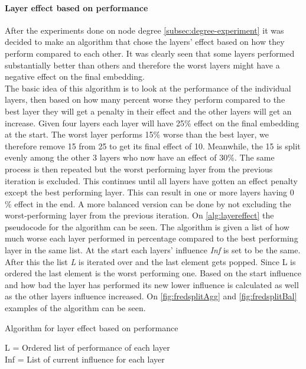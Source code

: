 \paragraph{Layer effect based on performance} \label{fredsplit}
After the experiments done on node degree \autoref{subsec:degree-experiment} it was decided to make an algorithm that chose the layers' effect based on how they perform compared to each other.
It was clearly seen that some layers performed substantially better than others and therefore the worst layers might have a negative effect on the final embedding.
\\
The basic idea of this algorithm is to look at the performance of the individual layers, then based on how many percent worse they perform compared to the best layer they will get a penalty in their effect and the other layers will get an increase.
Given four layers each layer will have 25\% effect on the final embedding at the start.
The worst layer performs 15\% worse than the best layer, we therefore remove 15 from 25 to get its final effect of 10.
Meanwhile, the 15 is split evenly among the other 3 layers who now have an effect of 30\%.
The same process is then repeated but the worst performing layer from the previous iteration is excluded.
This continues until all layers have gotten an effect penalty except the best performing layer.
This can result in one or more layers having 0 \% effect in the end.
A more balanced version can be done by not excluding the worst-performing layer from the previous iteration.
On \autoref{alg:layereffect} the pseudocode for the algorithm can be seen.
The algorithm is given a list of how much worse each layer performed in percentage compared to the best performing layer in the same list.
At the start each layers' influence \textit{Inf} is set to be the same.
After this the list \textit{L} is iterated over and the last element gets popped.
Since L is ordered the last element is the worst performing one.
Based on the start influence and how bad the layer has performed its new lower influence is calculated as well as the other layers influence increased.
On \autoref{fig:fredsplitAgg} and \autoref{fig:fredsplitBal} examples of the algorithm can be seen.


\begin{algorithm}
    \caption{Algorithm for layer effect based on performance}
    \SetAlgoLined
     L = Ordered list of performance of each layer \\
     Inf = List of current influence for each layer \\
     \label{alg:layereffect}
    \end{algorithm}


